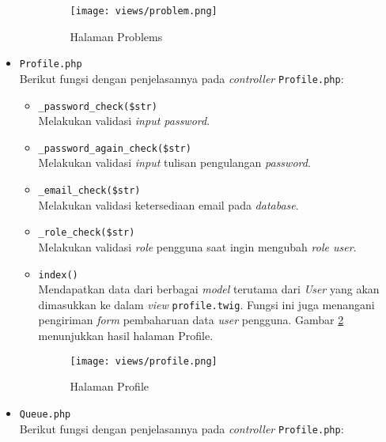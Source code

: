 \begin{itemize}
\begin{itemize}
		            \begin{figure}[H]
			            \centering
			            \texttt{[image: views/problem.png]}
			            \caption{Halaman Problems}
			            \label{fig:3:1:1:problem}
		            \end{figure}

	      \end{itemize}

	\item \verb|Profile.php| \\
	      Berikut fungsi dengan penjelasannya pada \textit{controller} \verb|Profile.php|:

	      \begin{itemize}
		      \item \verb|_password_check($str)| \\
		            Melakukan validasi \textit{input password}.
		      \item \verb|_password_again_check($str)| \\
		            Melakukan validasi \textit{input} tulisan pengulangan \textit{password}.
		      \item \verb|_email_check($str)| \\
		            Melakukan validasi ketersediaan email pada \textit{database}.
		      \item \verb|_role_check($str)| \\
		            Melakukan validasi \textit{role} pengguna saat ingin mengubah \textit{role user}.
		      \item \verb|index()| \\
		            Mendapatkan data dari berbagai \textit{model} terutama dari \textit{User} yang akan dimasukkan ke dalam \textit{view} \verb|profile.twig|. Fungsi ini juga menangani pengiriman \textit{form} pembaharuan data \textit{user} pengguna. Gambar \ref{fig:3:1:1:profile} menunjukkan hasil halaman Profile.

		            \begin{figure}[H]
			            \centering
			            \texttt{[image: views/profile.png]}
			            \caption{Halaman Profile}
			            \label{fig:3:1:1:profile}
		            \end{figure}

	      \end{itemize}

	\item \verb|Queue.php| \\
	      Berikut fungsi dengan penjelasannya pada \textit{controller} \verb|Profile.php|:


\end{itemize}
